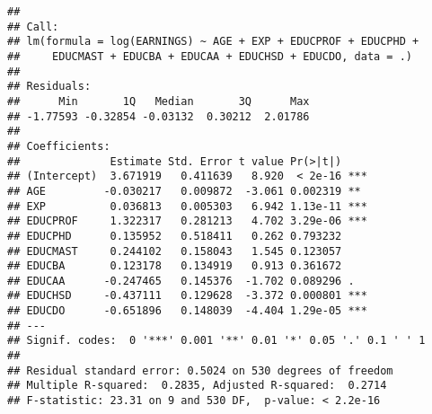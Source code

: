 \documentclass[
]{article}
\begin{document}
\begin{verbatim}
## 
## Call:
## lm(formula = log(EARNINGS) ~ AGE + EXP + EDUCPROF + EDUCPHD + 
##     EDUCMAST + EDUCBA + EDUCAA + EDUCHSD + EDUCDO, data = .)
## 
## Residuals:
##      Min       1Q   Median       3Q      Max 
## -1.77593 -0.32854 -0.03132  0.30212  2.01786 
## 
## Coefficients:
##              Estimate Std. Error t value Pr(>|t|)    
## (Intercept)  3.671919   0.411639   8.920  < 2e-16 ***
## AGE         -0.030217   0.009872  -3.061 0.002319 ** 
## EXP          0.036813   0.005303   6.942 1.13e-11 ***
## EDUCPROF     1.322317   0.281213   4.702 3.29e-06 ***
## EDUCPHD      0.135952   0.518411   0.262 0.793232    
## EDUCMAST     0.244102   0.158043   1.545 0.123057    
## EDUCBA       0.123178   0.134919   0.913 0.361672    
## EDUCAA      -0.247465   0.145376  -1.702 0.089296 .  
## EDUCHSD     -0.437111   0.129628  -3.372 0.000801 ***
## EDUCDO      -0.651896   0.148039  -4.404 1.29e-05 ***
## ---
## Signif. codes:  0 '***' 0.001 '**' 0.01 '*' 0.05 '.' 0.1 ' ' 1
## 
## Residual standard error: 0.5024 on 530 degrees of freedom
## Multiple R-squared:  0.2835, Adjusted R-squared:  0.2714 
## F-statistic: 23.31 on 9 and 530 DF,  p-value: < 2.2e-16
\end{verbatim}
\end{document}
